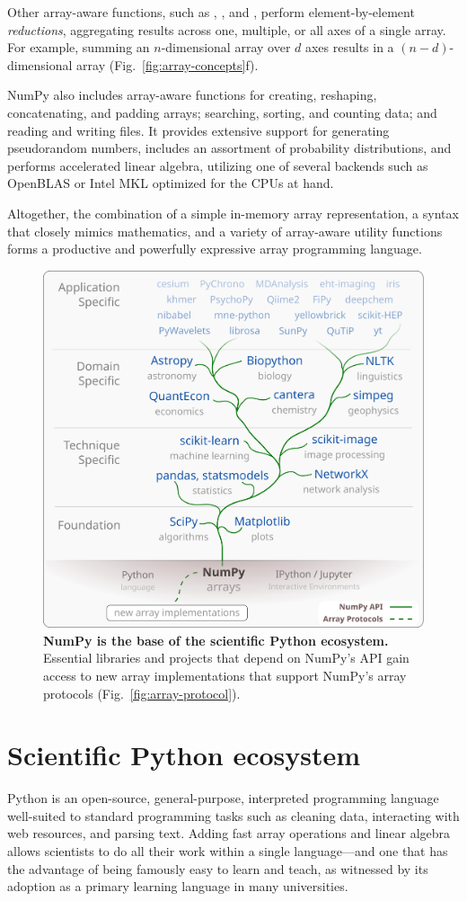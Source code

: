 Other array-aware functions, such as , , and , perform
element-by-element \emph{reductions}, aggregating results across one,
multiple, or all axes of a single array.
For example, summing an $n$-dimensional array over $d$ axes results in a
$(n-d)$-dimensional array (Fig.~\ref{fig:array-concepts}f).

NumPy also includes array-aware functions for creating, reshaping, concatenating, and padding
arrays; searching, sorting, and counting data; and reading and writing files.
It provides extensive support for generating pseudorandom numbers,
includes an assortment of probability distributions, and
performs accelerated linear algebra, utilizing one of several backends
such as OpenBLAS \cite{wang2013augem,xianyi2012model} or Intel MKL optimized
for the CPUs at hand.

Altogether, the combination of a simple in-memory array
representation, a syntax that closely mimics mathematics, and a
variety of array-aware utility functions forms a productive and
powerfully expressive array programming language.

\begin{figure}
  \centering
  \includegraphics[width=.5\textwidth]{static/sketches/ecosystem}
  \caption{\textbf{NumPy is the base of the scientific Python ecosystem.}
   Essential libraries and projects that depend on NumPy's API gain access to new array
   implementations that support NumPy's array protocols (Fig.~\ref{fig:array-protocol}).
  }
  \label{fig:ecosystem}
\end{figure}

\section*{Scientific Python ecosystem}

Python is an open-source, general-purpose, interpreted programming language
well-suited to standard programming tasks such as cleaning data,
interacting with web resources, and parsing text.
Adding fast array operations and linear algebra allows scientists to do all
their work within a single language---and one that has the advantage of
being famously easy to learn and teach, as witnessed by its adoption
as a primary learning language in many universities.

